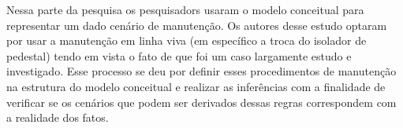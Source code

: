 Nessa parte da pesquisa os pesquisadors usaram o modelo conceitual para representar um dado cenário de manutenção. Os autores desse estudo optaram por usar a manutenção em linha viva (em específico a troca do isolador de pedestal) tendo em vista o fato de que foi um caso largamente estudo e investigado. Esse processo se deu por definir esses procedimentos de manutenção na estrutura do modelo conceitual e realizar as inferências com a finalidade de verificar se os cenários que podem ser derivados dessas regras correspondem com a realidade dos fatos. 